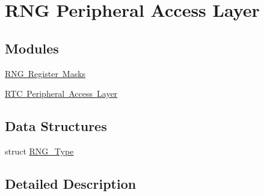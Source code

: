\hypertarget{group___r_n_g___peripheral___access___layer}{}\section{R\+NG Peripheral Access Layer}
\label{group___r_n_g___peripheral___access___layer}
\subsection*{Modules}
\begin{DoxyCompactItemize}
\item 
\mbox{\hyperlink{group___r_n_g___register___masks}{R\+N\+G Register Masks}}
\item 
\mbox{\hyperlink{group___r_t_c___peripheral___access___layer}{R\+T\+C Peripheral Access Layer}}
\end{DoxyCompactItemize}
\subsection*{Data Structures}
\begin{DoxyCompactItemize}
\item 
struct \mbox{\hyperlink{struct_r_n_g___type}{R\+N\+G\+\_\+\+Type}}
\end{DoxyCompactItemize}


\subsection{Detailed Description}
